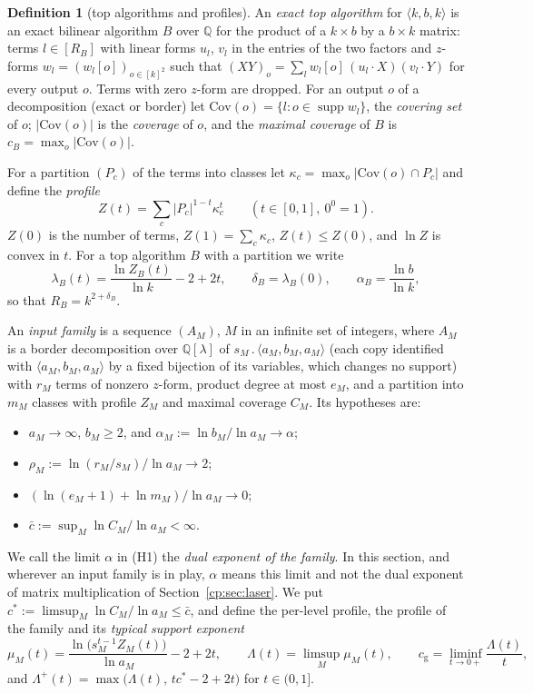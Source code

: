 \documentclass[11pt]{article}
\theoremstyle{definition}
\newtheorem{definition}[theorem]{Definition}
\theoremstyle{remark}
\providecommand{\Q}{\mathbb{Q}}
\newcommand{\abs}[1]{\lvert #1\rvert}
\DeclareMathOperator{\supp}{supp}
\newcommand{\mat}[3]{\langle #1,#2,#3\rangle} %
\newcommand{\cp}{\mathbin{.}}                 %
\newcommand{\Cov}{\mathrm{Cov}}               %
\newcommand{\cB}{c_B}                         %
\newcommand{\ZB}{Z_B}                         %
\newcommand{\lamB}{\lambda_B}                 %
\newcommand{\delB}{\delta_B}                  %
\newcommand{\alB}{\alpha_B}                   %
\newcommand{\RB}{R_B}                         %
\newcommand{\Lam}{\Lambda}                    %
\newcommand{\Lamp}{\Lambda^{+}}               %
\newcommand{\cg}{c_{\mathrm g}}               %
\newcommand{\cstar}{c^{*}}                    %
\newcommand{\cbar}{\bar c}                    %
\newcommand{\Hcond}[1]{\textup{(H#1)}}        %
\begin{document}
\begin{definition}[top algorithms and profiles]\label{cp:T1}
An \emph{exact top algorithm} for $\mat kbk$ is an exact bilinear algorithm $B$ over $\Q$ for the product of a $k\times b$ by a $b\times k$ matrix: terms $l\in[\RB]$ with linear forms $u_l$, $v_l$ in the entries of the two factors and $z$-forms $w_l=(w_l[o])_{o\in[k]^2}$ such that $(XY)_o=\sum_lw_l[o]\,(u_l\cdot X)(v_l\cdot Y)$ for every output $o$. Terms with zero $z$-form are dropped. For an output $o$ of a decomposition (exact or border) let $\Cov(o)=\{l:o\in\supp w_l\}$, the \emph{covering set} of $o$; $\abs{\Cov(o)}$ is the \emph{coverage} of $o$, and the \emph{maximal coverage} of $B$ is $\cB=\max_o\abs{\Cov(o)}$.

For a partition $(P_c)$ of the terms into classes let $\kappa_c=\max_o\abs{\Cov(o)\cap P_c}$ and define the \emph{profile}
\[
Z(t)=\sum_c\abs{P_c}^{1-t}\kappa_c^t\qquad(t\in[0,1],\ 0^0=1).
\]
$Z(0)$ is the number of terms, $Z(1)=\sum_c\kappa_c$, $Z(t)\le Z(0)$, and $\ln Z$ is convex in $t$. For a top algorithm $B$ with a partition we write
\[
\lamB(t)=\frac{\ln\ZB(t)}{\ln k}-2+2t,\qquad\delB=\lamB(0),\qquad\alB=\frac{\ln b}{\ln k},
\]
so that $\RB=k^{2+\delB}$.

An \emph{input family} is a sequence $(A_M)$, $M$ in an infinite set of integers, where $A_M$ is a border decomposition over $\Q[\lambda]$ of $s_M\cp\mat{a_M}{b_M}{a_M}$ (each copy identified with $\mat{a_M}{b_M}{a_M}$ by a fixed bijection of its variables, which changes no support) with $r_M$ terms of nonzero $z$-form, product degree at most $e_M$, and a partition into $m_M$ classes with profile $Z_M$ and maximal coverage $C_M$. Its hypotheses are:
\begin{itemize}
\item[\Hcond1] $a_M\to\infty$, $b_M\ge2$, and $\alpha_M:=\ln b_M/\ln a_M\to\alpha$;
\item[\Hcond2] $\rho_M:=\ln(r_M/s_M)/\ln a_M\to2$;
\item[\Hcond3] $(\ln(e_M+1)+\ln m_M)/\ln a_M\to0$;
\item[\Hcond4] $\cbar:=\sup_M\ln C_M/\ln a_M<\infty$.
\end{itemize}
We call the limit $\alpha$ in \Hcond1 the \emph{dual exponent of the family}. In this section, and wherever an input family is in play, $\alpha$ means this limit and not the dual exponent of matrix multiplication of Section~\ref{cp:sec:laser}. We put $\cstar:=\limsup_M\ln C_M/\ln a_M\le\cbar$, and define the per-level profile, the profile of the family and its \emph{typical support exponent}
\[
\mu_M(t)=\frac{\ln\bigl(s_M^{t-1}Z_M(t)\bigr)}{\ln a_M}-2+2t,\qquad\Lam(t)=\limsup_M\mu_M(t),\qquad\cg=\liminf_{t\to0+}\frac{\Lam(t)}{t},
\]
and $\Lamp(t)=\max\bigl(\Lam(t),\,t\cstar-2+2t\bigr)$ for $t\in(0,1]$.
\end{definition}
\end{document}
